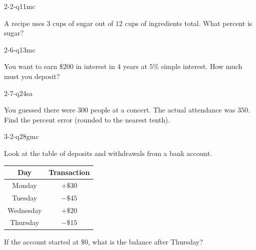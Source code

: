 \documentclass[12pt, fleqn, openany]{studyGuide}
\begin{document}
\begin{practiceQuestion}{2-2-q11}{mc}
\begin{questionText}
A recipe uses $3$ cups of sugar out of $12$ cups of ingredients total. What percent is sugar?
\end{questionText}
\end{practiceQuestion}

\begin{practiceQuestion}{2-6-q13}{mc}
\begin{questionText}
You want to earn $\$200$ in interest in $4$ years at $5\%$ simple interest. How much must you deposit?
\end{questionText}
\end{practiceQuestion}

\begin{practiceQuestion}{2-7-q24}{sa}
\begin{questionText}
You guessed there were $300$ people at a concert. The actual attendance was $350$. Find the percent error (rounded to the nearest tenth).
\end{questionText}
\end{practiceQuestion}

\begin{practiceQuestion}{3-2-q28}{gmc}
\begin{questionText}
Look at the table of deposits and withdrawals from a bank account.

\begin{center}
\begin{tabular}{|c|c|}
\hline
\textbf{Day} & \textbf{Transaction} \\
\hline
Monday & $+\$30$ \\
\hline
Tuesday & $-\$45$ \\
\hline
Wednesday & $+\$20$ \\
\hline
Thursday & $-\$15$ \\
\hline
\end{tabular}
\end{center}

If the account started at $\$0$, what is the balance after Thursday?
\end{questionText}
\end{practiceQuestion}
\end{document}
